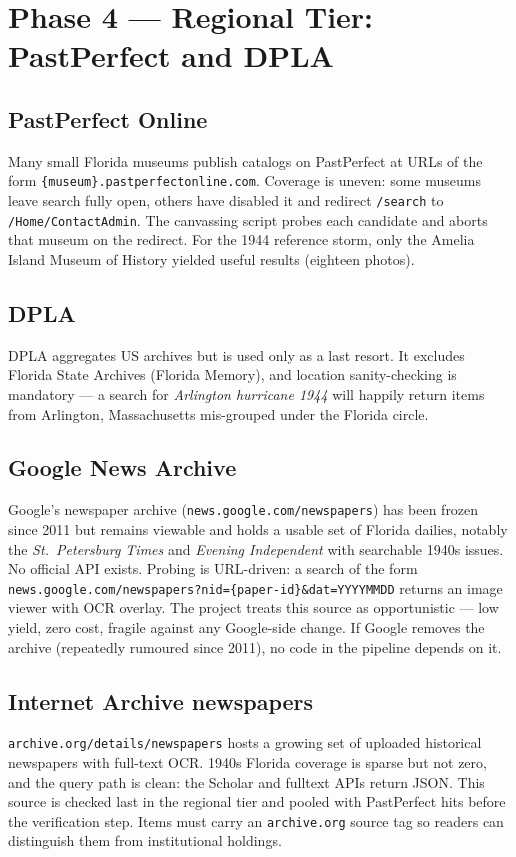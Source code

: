 \documentclass[11pt,letterpaper]{article}
\begin{document}
\section{Phase 4 --- Regional Tier: PastPerfect and DPLA}

\subsection{PastPerfect Online}
Many small Florida museums publish catalogs on PastPerfect at URLs of the form \texttt{\{museum\}.pastperfectonline.com}. Coverage is uneven: some museums leave search fully open, others have disabled it and redirect \texttt{/search} to \texttt{/Home/ContactAdmin}. The canvassing script probes each candidate and aborts that museum on the redirect. For the 1944 reference storm, only the Amelia Island Museum of History yielded useful results (eighteen photos).

\subsection{DPLA}
DPLA aggregates US archives but is used only as a last resort. It excludes Florida State Archives (Florida Memory), and location sanity-checking is mandatory --- a search for \emph{Arlington hurricane 1944} will happily return items from Arlington, Massachusetts mis-grouped under the Florida circle.

\subsection{Google News Archive}
Google's newspaper archive (\texttt{news.google.com/newspapers}) has been frozen since 2011 but remains viewable and holds a usable set of Florida dailies, notably the \emph{St.~Petersburg Times} and \emph{Evening Independent} with searchable 1940s issues. No official API exists. Probing is URL-driven: a search of the form \texttt{news.google.com/newspapers?nid=\{paper-id\}\&dat=YYYYMMDD} returns an image viewer with OCR overlay. The project treats this source as opportunistic --- low yield, zero cost, fragile against any Google-side change. If Google removes the archive (repeatedly rumoured since 2011), no code in the pipeline depends on it.

\subsection{Internet Archive newspapers}
\texttt{archive.org/details/newspapers} hosts a growing set of uploaded historical newspapers with full-text OCR. 1940s Florida coverage is sparse but not zero, and the query path is clean: the Scholar and fulltext APIs return JSON. This source is checked last in the regional tier and pooled with PastPerfect hits before the verification step. Items must carry an \texttt{archive.org} source tag so readers can distinguish them from institutional holdings.
\end{document}
